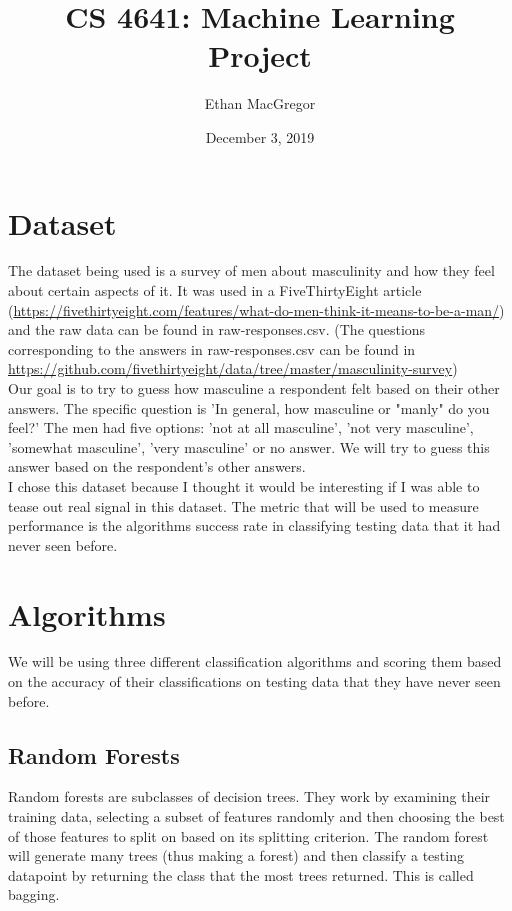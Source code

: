 \documentclass{article}
\title{CS 4641: Machine Learning\\
Project}
\date{December 3, 2019}
\author{Ethan MacGregor}
\begin{document}
\maketitle

\section{Dataset}

The dataset being used is a survey of men about masculinity and how they feel about certain aspects of it. It was used in a FiveThirtyEight article (\url{https://fivethirtyeight.com/features/what-do-men-think-it-means-to-be-a-man/}) and the raw data can be found in raw-responses.csv. (The questions corresponding to the answers in raw-responses.csv can be found in \url{https://github.com/fivethirtyeight/data/tree/master/masculinity-survey})\\

Our goal is to try to guess how masculine a respondent felt based on their other answers. The specific question is 'In general, how masculine or "manly" do you feel?' The men had five options: 'not at all masculine', 'not very masculine', 'somewhat masculine', 'very masculine' or no answer. We will try to guess this answer based on the respondent's other answers.\\

I chose this dataset because I thought it would be interesting if I was able to tease out real signal in this dataset. The metric that will be used to measure performance is the algorithms success rate in classifying testing data that it had never seen before.\\

\section{Algorithms}

We will be using three different classification algorithms and scoring them based on the accuracy of their classifications on testing data that they have never seen before.

\subsection{Random Forests}

Random forests are subclasses of decision trees. They work by examining their training data, selecting a subset of features randomly and then choosing the best of those features to split on based on its splitting criterion. The random forest will generate many trees (thus making a forest) and then classify a testing datapoint by returning the class that the most trees returned. This is called bagging.\\
\end{document}
